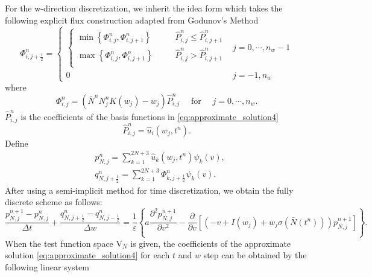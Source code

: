 For the w-direction discretization, we inherit the idea form \cite{he2022structure} which takes the following explicit flux construction adapted from Godunov's Method 
 \begin{equation}
    \Phi_{i, j+\frac{1}{2}}^{n}=
        \begin{cases}
            \begin{cases}
                \min \left\{\Phi_{i, j}^{n}, \Phi_{i, j+1}^{n}\right\} \qquad &\hat{P}_{i, j}^{n} \leq \hat{P}_{i, j+1}^{n} \\
                \max \left\{\Phi_{i, j}^{n}, \Phi_{i, j+1}^{n}\right\}  &\hat{P}_{i, j}^{n}>\hat{P}_{i, j+1}^{n} \\
            \end{cases}&j=0, \cdots, n_{w}-1\\
            0  &j=-1, n_{w}
        \end{cases}
    \end{equation}
where
\begin{equation}
    \Phi_{i, j}^{n}=\left(\bar{N}^{n} N_{j}^{n} K\left(w_{j}\right)-w_{j}\right) \hat{P}_{i, j}^{n} \quad \text { for } \quad j=0, \cdots, n_{w}.
\end{equation}
$\hat{P}_{i,j}^n$ is the coefficients of the basis functions in \eqref{eq:approximate_solution4}
\begin{equation}
    \hat{P}_{i,j}^n=\hat{u}_i(w_j,t^n).
\end{equation}
Define 
\begin{equation}
\begin{aligned}
    &p_{N,j}^{n}=\sum_{k=1}^{2N+3}\hat{u}_k(w_j,t^n)\psi_k(v),\\
    &q_{N,j+\frac{1}{2}}^n=\sum_{k=1}^{2N+3} \Phi_{k,j+\frac{1}{2}}^{n}\psi_k(v).
\end{aligned}
\end{equation}
After using a semi-implicit method for time discretization, we obtain the fully discrete scheme as follows:
\begin{equation}
    \frac{p_{N,j}^{n+1}-p_{N,j}^{n}}{\Delta t}+\frac{q_{N,j+\frac{1}{2}}^n-q_{N,j-\frac{1}{2}}^n}{\Delta w}=\frac{1}{\varepsilon}\left\{a\frac{\partial^2p_{N,j}^{n+1}}{\partial v^2}-\frac{\partial}{\partial v}\left[(-v+I(w_j)+w_j\sigma(\bar{N}(t^n)))p_{N,j}^{n+1}\right]\right\}.
\end{equation}
When the test function space $\mathrm{V}_N$ is given, the coefficients of the approximate solution \eqref{eq:approximate_solution4} for each $t$ and $w$ step can be obtained by the following linear system
